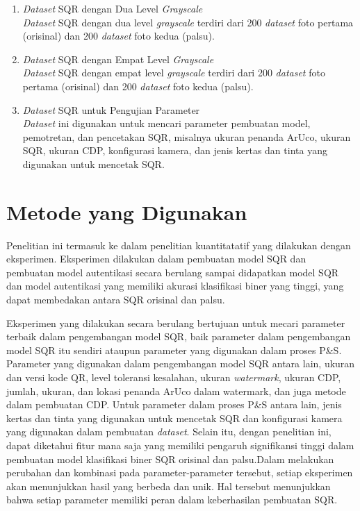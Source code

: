 \begin{enumerate}
	\item \emph{Dataset} SQR dengan Dua Level \emph{Grayscale}\\\emph{Dataset} SQR dengan dua level \emph{grayscale} terdiri dari 200 \emph{dataset} foto pertama (orisinal) dan 200 \emph{dataset} foto kedua (palsu).
	\item \emph{Dataset} SQR dengan Empat Level \emph{Grayscale}\\\emph{Dataset} SQR dengan empat level \emph{grayscale} terdiri dari 200 \emph{dataset} foto pertama (orisinal) dan 200 \emph{dataset} foto kedua (palsu).
	\item \emph{Dataset} SQR untuk Pengujian Parameter\\\emph{Dataset} ini digunakan untuk mencari parameter pembuatan model, pemotretan, dan pencetakan SQR, misalnya ukuran penanda ArUco, ukuran SQR, ukuran CDP, konfigurasi kamera, dan jenis kertas dan tinta yang digunakan untuk mencetak SQR.
\end{enumerate}

\section{Metode yang Digunakan}
Penelitian ini termasuk ke dalam penelitian kuantitatatif yang dilakukan dengan eksperimen. Eksperimen dilakukan dalam pembuatan model SQR dan pembuatan model autentikasi secara berulang sampai didapatkan model SQR dan model autentikasi yang memiliki akurasi klasifikasi biner yang tinggi, yang dapat membedakan antara SQR orisinal dan palsu.

Eksperimen yang dilakukan secara berulang bertujuan untuk mecari parameter terbaik dalam pengembangan model SQR, baik parameter dalam pengembangan model SQR itu sendiri ataupun parameter yang digunakan dalam proses P\&S. Parameter yang digunakan dalam pengembangan model SQR antara lain, ukuran dan versi kode QR, level toleransi kesalahan, ukuran \emph{watermark}, ukuran CDP, jumlah, ukuran, dan lokasi penanda ArUco dalam watermark, dan juga metode dalam pembuatan CDP. Untuk parameter dalam proses P\&S antara lain, jenis kertas dan tinta yang digunakan untuk mencetak SQR dan konfigurasi kamera yang digunakan dalam pembuatan \emph{dataset}. Selain itu, dengan penelitian ini, dapat diketahui fitur mana saja yang memiliki pengaruh signifikansi tinggi dalam pembuatan model klasifikasi biner SQR orisinal dan palsu.Dalam melakukan perubahan dan kombinasi pada parameter-parameter tersebut, setiap eksperimen akan menunjukkan hasil yang berbeda dan unik. Hal tersebut menunjukkan bahwa setiap parameter memiliki peran dalam keberhasilan pembuatan SQR.

